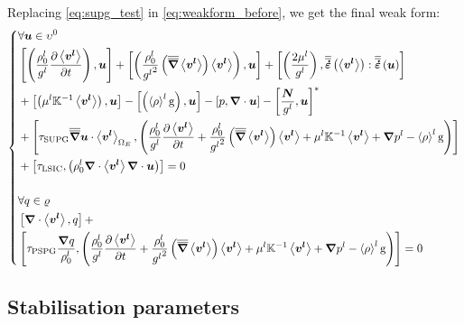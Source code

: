 Replacing \cref{eq:supg_test} in \cref{eq:weakform_before}, we get the final weak form:
\begin{equation}
	\label{eq:weakform_after}
   \left\{
   \begin{aligned}
    &\forall \vec{u} \in \upsilon^0 \\
	&\crochet{ \brac{\frac{\rholref}{\gl} \tempup{\vit}},\vec{u}} + 
	 \crochet{ \brac{\frac{\rholref}{\gl^2} \brac{\nabmat \vit} \vit},\vec{u}} + 
	 \crochet{\brac{\frac{2\mul}{\gl}}, \strainrate\brac{\vit}:\strainrate\brac{\vec{u}} } \\
	& + \crochet{\brac{\mul \K^{-1} \vit },\vec{u}}
	 - \crochet{\brac{\rhol \gravity},\vec{u}}
	 - \crochet{p,\nabvec \cdot \vec{u}}
	 - \crochet{\frac{\vec{N}}{\gl},\vec{u}}^{*} \\
	 & + \crochet{\tausupg \nabmat \vec{u} \cdot \vit_{\Ohm_E} , 
	 \brac{\frac{\rholref}{\gl} \tempup{\vit} + \frac{\rholref}{\gl^2} \brac{\nabmat \vit} \vit
	   +  \mul \K^{-1} \vit + \nabvec \pl -\rhol \gravity} } \\
	 & + \crochet{\taulsic, \brac{\rholref \nabvec \cdot \vit \nabvec \cdot \vec{u} }} = 0  \\ \\
	 &\forall q \in \varrho \\
	&\crochet{ \nabvec \cdot \vit, q} + \\
	&\crochet{\taupspg \frac{\nabvec q}{\rholref}, \brac{\frac{\rholref}{\gl} \tempup{\vit} 
	+ \frac{\rholref}{\gl^2} \brac{\nabmat \vit} \vit 
	+ \mul \K^{-1} \vit + \nabvec \pl -\rhol \gravity}} = 0
    \end{aligned}
    \right.
\end{equation}
\subsection{Stabilisation parameters}

